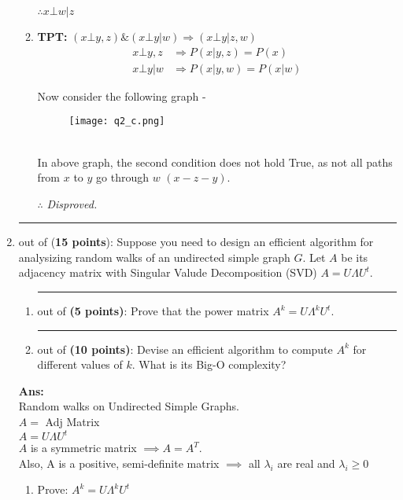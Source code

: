 \documentclass{article}%
\begin{document}
\begin{enumerate}
\begin{enumerate}
$\therefore x \bot w | z $

\item \textbf{TPT:} $(x \bot y, z) \& (x \bot y | w) \Longrightarrow (x \bot y | z, w)$ \\
\setcounter{equation}{0}
\begin{align}
x \bot y, z & \Longrightarrow P(x | y, z) = P(x) \\
x \bot y | w & \Longrightarrow P(x | y, w) = P(x | w) 
\end{align}

Now consider the following graph -
\begin{figure}[h]
\centering
\texttt{[image: q2\_c.png]}
\end{figure} \\
In above graph, the second condition does not hold True, as not all paths from $ x$ to $y$ go through $w$ $(x - z - y)$.

$\therefore$ \textit{Disproved.}
\end{enumerate}


\newpage

  \item \rule{0.5 in}{1 pt} out of (\textbf{15 points}): Suppose you need to design an efficient algorithm for analysizing random walks of an undirected simple graph $G$. Let $A$ be its adjacency matrix with Singular Valude Decomposition (SVD) $A=U\Lambda{U^t}$.
		\begin{enumerate}
		\item \rule{0.5 in}{1 pt} out of \textbf{(5 points)}: Prove that the power matrix ${A^k} = U{\Lambda^k}{U^t}$. \\
		
		\item \rule{0.5 in}{1 pt} out of \textbf{(10 points)}: Devise an efficient algorithm to compute $A^k$ for different values of $k$. What is its Big-O complexity?
		\end{enumerate}
			
\textbf{Ans:} \\
Random walks on Undirected Simple Graphs. \\
$ A = $ Adj Matrix \\
$ A = U{\Lambda}{U^t}$ \\

$A$ is a symmetric matrix $\implies A = A^T $.\\
Also, A is a positive, semi-definite matrix $\implies $ all $\lambda_i$ are real and $\lambda_i \geq 0 $
\begin{enumerate}
\item Prove: $ A^k = U{\Lambda^k}{U^t}$ \\


\end{enumerate}
\end{enumerate}
\end{document}
